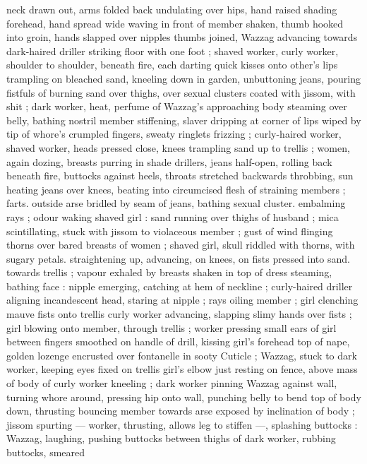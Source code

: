 neck drawn out, arms folded back undulating over hips, hand raised 
shading forehead, hand spread wide waving in front of member 
shaken, thumb hooked into groin, hands slapped over nipples 
thumbs joined, Wazzag advancing towards dark-haired driller striking 
floor with one foot ; shaved worker, curly worker, shoulder to 
shoulder, beneath fire, each darting quick kisses onto other's lips 
trampling on bleached sand, kneeling down in garden, unbuttoning 
jeans, pouring fistfuls of burning sand over thighs, over sexual 
clusters coated with jissom, with shit ; dark worker, heat, perfume of 
Wazzag's approaching body steaming over belly, bathing nostril 
member stiffening, slaver dripping at corner of lips wiped by tip of 
whore's crumpled fingers, sweaty ringlets frizzing ; curly-haired 
worker, shaved worker, heads pressed close, knees trampling sand 
up to trellis ; women, again dozing, breasts purring in shade 
drillers, jeans half-open, rolling back beneath fire, buttocks against 
heels, throats stretched backwards throbbing, sun heating jeans over 
knees, beating into circumcised flesh of straining members ; farts. 
outside arse bridled by seam of jeans, bathing sexual cluster. 
embalming rays ; odour waking shaved girl : sand running over 
thighs of husband ; mica scintillating, stuck with jissom to violaceous 
member ; gust of wind flinging thorns over bared breasts of women 
; shaved girl, skull riddled with thorns, with sugary petals. 
straightening up, advancing, on knees, on fists pressed into sand. 
towards trellis ; vapour exhaled by breasts shaken in top of dress 
steaming, bathing face : nipple emerging, catching at hem of 
neckline ; curly-haired driller aligning incandescent head, staring at 
nipple ; rays oiling member ; girl clenching mauve fists onto trellis 
curly worker advancing, slapping slimy hands over fists ; girl blowing 
onto member, through trellis ; worker pressing small ears of girl 
between fingers smoothed on handle of drill, kissing girl's forehead 
top of nape, golden lozenge encrusted over fontanelle in sooty 
Cuticle ; Wazzag, stuck to dark worker, keeping eyes fixed on trellis 
girl's elbow just resting on fence, above mass of body of curly 
worker kneeling ; dark worker pinning Wazzag against wall, turning 
whore around, pressing hip onto wall, punching belly to bend top of 
body down, thrusting bouncing member towards arse exposed by 
inclination of body ; jissom spurting --- worker, thrusting, allows leg 
to stiffen ---, splashing buttocks : Wazzag, laughing, pushing 
buttocks between thighs of dark worker, rubbing buttocks, smeared 
